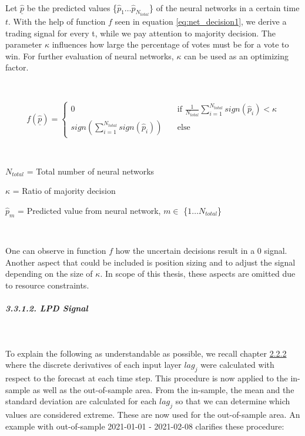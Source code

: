 \documentclass[
]{article}
\begin{document}
~

Let \(\hat{\underline{p}}\) be the predicted values
\{\(\hat{p}_{1}\dotsc\hat{p}_{N_{total}}\)\} of the neural networks in a
certain time \(t\). With the help of function \(f\) seen in equation
\ref{eq:net_decision1}, we derive a trading signal for every t, while we
pay attention to majority decision. The parameter \(\kappa\) influences
how large the percentage of votes must be for a vote to win. For further
evaluation of neural networks, \(\kappa\) can be used as an optimizing
factor.

~

\begin{equation}\label{eq:net_decision1}
 f(\hat{\underline{p}}) =
\begin{cases} 
  0      & \quad \text{if } \frac{1}{N_{total}}  \sum_{i=1}^{N_{total}}sign(\hat{p}_{i}) < \kappa \\
  sign(\sum_{i=1}^{N_{total}}sign(\hat{p}_{i}))    & \quad \text{else}
  

   \end{cases}
\end{equation}

~

\(N_{total}\) = Total number of neural networks

\(\kappa\) = Ratio of majority decision

\(\hat{p}_{m}\) = Predicted value from neural network, \(m \in\)
\{\(1 \dotsc N_{total}\)\}

~

One can observe in function \(f\) how the uncertain decisions result in
a 0 signal. Another aspect that could be included is position sizing and
to adjust the signal depending on the size of \(\kappa\). In scope of
this thesis, these aspects are omitted due to resource constraints.

\newpage

\hypertarget{lpd-signal}{%
\subparagraph{3.3.1.2. LPD Signal}\label{lpd-signal}}

~

To explain the following as understandable as possible, we recall
chapter \protect\hyperlink{xai_finance}{2.2.2} where the discrete
derivatives of each input layer \(lag_{j}\) were calculated with respect
to the forecast at each time step. This procedure is now applied to the
in-sample as well as the out-of-sample area. From the in-sample, the
mean and the standard deviation are calculated for each \(lag_{j}\) so
that we can determine which values are considered extreme. These are now
used for the out-of-sample area. An example with out-of-sample
2021-01-01 - 2021-02-08 clarifies these procedure:
\end{document}
